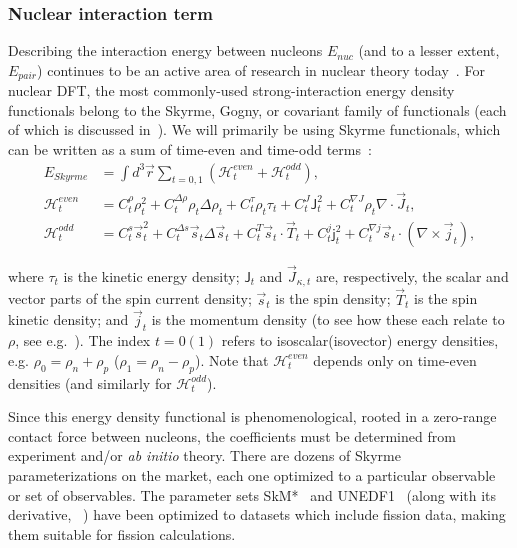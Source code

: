 \subsubsection{Nuclear interaction term}\label{sect:skyrmeterm}
Describing the interaction energy between nucleons $E_{nuc}$ (and to a lesser extent, $E_{pair}$) continues to be an active area of research in nuclear theory today~\cite{Machleidt2011,Machleidt2016,Epelbaum2009,Detmold2015,Stroberg2019}. For nuclear DFT, the most commonly-used strong-interaction energy density functionals belong to the Skyrme, Gogny, or covariant family of functionals (each of which is discussed in~\cite{bender2003}). We will primarily be using Skyrme functionals, which can be written as a sum of time-even and time-odd terms~\cite{Dobaczewski1995}:
\begin{align}
E_{Skyrme} &= \int d^3\vec{r} \sum_{t=0,1} \left( \mathcal{H}^{even}_t + \mathcal{H}^{odd}_t \right),\\
\mathcal{H}^{even}_t &= C^\rho_t\rho_t^2 + C_t^{\Delta\rho}\rho_t\Delta\rho_t + C^\tau_t\rho_t\tau_t + C^J_t\mathsf{J}^2_t + C^{\nabla J}_t\rho_t\nabla\cdot\vec{J}_t, \\
\mathcal{H}^{odd}_t &= C^s_t \vec{s}_t^2 + C_t^{\Delta s}\vec{s}_t\Delta\vec{s}_t + C^T_t\vec{s}_t\cdot\vec{T}_t + C^j_t\mathsf{j}^2_t + C^{\nabla j}_t\vec{s}_t\cdot(\nabla\times\vec{j}_t),
\end{align}

\noindent where $\tau_t$ is the kinetic energy density; $\mathsf{J}_t$ and $\vec{J}_{\kappa,t}$ are, respectively, the scalar and vector parts of the spin current density; $\vec{s}_t$ is the spin density; $\vec{T}_t$ is the spin kinetic density; and $\vec{j}_t$ is the momentum density (to see how these each relate to $\rho$, see e.g.~\cite{bender2003}). The index $t=0(1)$ refers to isoscalar(isovector) energy densities, e.g. $\rho_0 = \rho_n + \rho_p$ ($\rho_1 = \rho_n - \rho_p$). Note that $\mathcal{H}^{even}_t$ depends only on time-even densities (and similarly for $\mathcal{H}^{odd}_t$).

Since this energy density functional is phenomenological, rooted in a zero-range contact force between nucleons, the coefficients must be determined from experiment and/or \textit{ab initio} theory. There are dozens of Skyrme parameterizations on the market, each one optimized to a particular observable or set of observables. The parameter sets SkM*~\cite{Bartel1982} and UNEDF1~\cite{Kortelainen2012} (along with its derivative, {\hfb}~\cite{Schunck2015}) have been optimized to datasets which include fission data, making them suitable for fission calculations.

